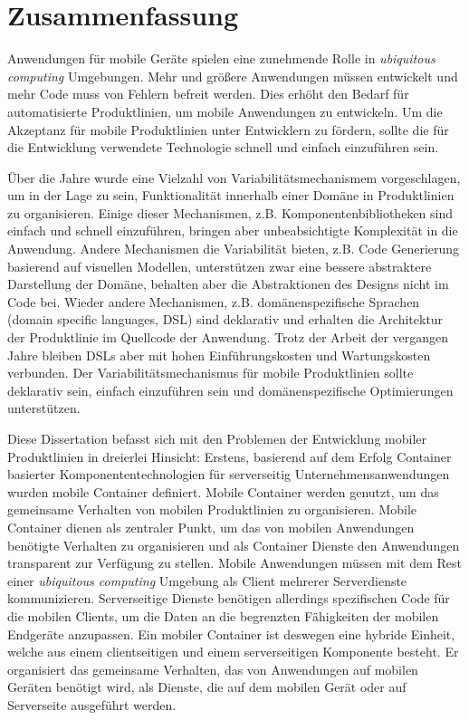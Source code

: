 \chapter*{Zusammenfassung}

\noindent Anwendungen f\"{u}r mobile Ger\"{a}te spielen eine zunehmende Rolle in  \textit{ubiquitous computing} Umgebungen. Mehr und gr\"{o}{\ss}ere Anwendungen m\"{u}ssen entwickelt und mehr Code muss von Fehlern befreit werden. Dies erh\"{o}ht den Bedarf f\"{u}r automatisierte Produktlinien, um mobile An\-we\-ndun\-gen zu entwickeln. Um die Akzeptanz f\"{u}r mobile Produktlinien unter Entwicklern zu f\"{o}rdern, sollte die f\"{u}r die Entwicklung verwendete Technologie schnell und einfach einzuf\"{u}hren sein.

\"{U}ber die Jahre wurde eine Vielzahl von Variabilit\"{a}tsmechanismem vorgeschlagen, 
um in der Lage zu sein, Funktionalit\"{a}t innerhalb einer Dom\"{a}ne in Produktlinien 
zu organisieren. Einige dieser Mechanismen, z.B. Komponentenbibliotheken sind einfach und schnell einzuf\"{u}hren, bringen aber unbeabsichtigte Komplexit\"{a}t in die Anwendung. Andere Mechanismen die Variabilit\"{a}t bieten, z.B. Code Generierung basierend auf visuellen Modellen, unterst\"{u}tzen zwar eine bessere abstraktere Darstellung der Dom\"{a}ne, behalten aber die Abstraktionen des Designs nicht im Code bei. Wieder andere Mechanismen, z.B. dom\"{a}nenspezifische Sprachen (domain specific languages, DSL) sind deklarativ und  erhalten die Architektur der Produktlinie im Quellcode der An\-we\-ndung. Trotz der Arbeit der vergangen Jahre bleiben DSLs aber mit hohen Einf\"{u}hrungskosten und Wartungskosten verbunden. Der Variabilit\"{a}tsmechanismus f\"{u}r mobile Produktlinien sollte deklarativ sein, einfach einzuf\"{u}hren sein und dom\"{a}nenspezifische Optimierungen unterst\"{u}tzen.

Diese Dissertation befasst sich mit den Problemen der Entwicklung  
mobiler Pro\-dukt\-li\-nien in dreierlei Hinsicht: Erstens, basierend auf dem Erfolg Container basierter Komponententechnologien f\"{u}r serverseitig Unternehmensanwendungen wurden mobile Container definiert. Mobile Container werden genutzt, um das gemeinsame Verhalten von mobilen Produktlinien zu organisieren. 
Mobile Container dienen als zentraler Punkt, um das von mobilen An\-we\-ndu\-ngen ben\"{o}tigte Verhalten zu organisieren und als Container Dienste den Anwendungen transparent zur Verf\"{u}gung zu stellen.
Mobile Anwendungen m\"{u}ssen mit dem Rest einer \textit{ubiquitous computing}   
Umgebung als Client mehrerer Serverdienste kommunizieren. Serverseitige
Dienste ben\"{o}tigen allerdings spezifischen Code f\"{u}r die mobilen Clients, um  die Daten an die begrenzten F\"{a}higkeiten der mobilen Endger\"{a}te anzupassen. Ein mobiler Container ist deswegen eine hybride Einheit, welche aus einem clientseitigen und einem serverseitigen Komponente besteht. Er organisiert das gemeinsame Verhalten, das von Anwendungen auf mobilen Ger\"{a}ten ben\"{o}tigt wird, als Dienste, die auf dem mobilen Ger\"{a}t oder auf Serverseite ausgef\"{u}hrt werden. 

